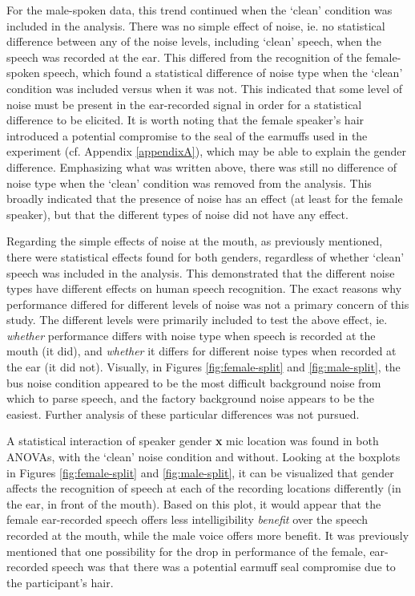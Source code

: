 For the male-spoken data, this trend continued when the `clean' condition was included in the analysis.  There was no simple effect of noise, ie. no statistical difference between any of the noise levels, including `clean' speech, when the speech was recorded at the ear.  This differed from the recognition of the female-spoken speech, which found a statistical difference of noise type when the `clean' condition was included versus when it was not.  This indicated that some level of noise must be present in the ear-recorded signal in order for a statistical difference to be elicited.  It is worth noting that the female speaker's hair introduced a potential compromise to the seal of the earmuffs used in the experiment (cf. Appendix \ref{appendixA}), which may be able to explain the gender difference. Emphasizing what was written above, there was still no difference of noise type when the `clean' condition was removed from the analysis.  This broadly indicated that the presence of noise has an effect (at least for the female speaker), but that the different types of noise did not have any effect.

Regarding the simple effects of noise at the mouth, as previously mentioned, there were statistical effects found for both genders, regardless of whether `clean' speech was included in the analysis.  This demonstrated that the different noise types have different effects on human speech recognition.  The exact reasons why performance differed for different levels of noise was not a primary concern of this study.  The different levels were primarily included to test the above effect, ie. \textit{whether} performance differs with noise type when speech is recorded at the mouth (it did), and \textit{whether} it differs for different noise types when recorded at the ear (it did not).   Visually, in Figures \ref{fig:female-split} and \ref{fig:male-split}, the bus noise condition appeared to be the most difficult background noise from which to parse speech, and the factory background noise appears to be the easiest.  Further analysis of these particular differences was not pursued.



A statistical interaction of speaker gender \textbf{x} mic location was found in both ANOVAs, with the `clean' noise condition and without.  
Looking at the boxplots in Figures \ref{fig:female-split} and \ref{fig:male-split}, it can be visualized that gender affects the recognition of speech at each of the recording locations differently (in the ear, in front of the mouth).  Based on this plot, it would appear that the female ear-recorded speech offers less intelligibility \textit{benefit} over the speech recorded at the mouth, while the male voice offers more benefit. It was previously mentioned that one possibility for the drop in performance of the female, ear-recorded speech was that there was a potential earmuff seal compromise due to the participant's hair.  

